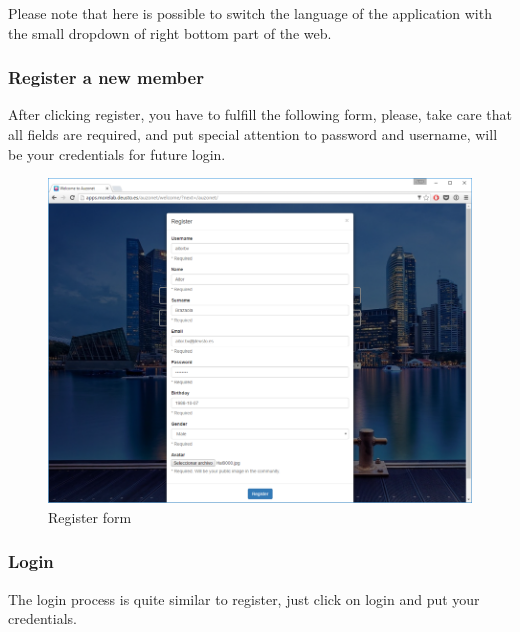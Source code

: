\documentclass{DeustoFDP}
\begin{document}
Please note that here is possible to switch the language of the application with the small dropdown of right bottom part of the web.
\subsubsection{Register a new member}
After clicking register, you have to fulfill the following form, please, take care that all fields are required, and put special attention to password and username, will be your credentials for future login.
\begin{figure}[h!]
\centering
\includegraphics[width=0.9\linewidth]{fig/Manual/register}
\caption[Register form]{Register form}
\label{fig:register}
\end{figure}

\subsubsection{Login}
The login process is quite similar to register, just click on login and put your credentials.
\end{document}
